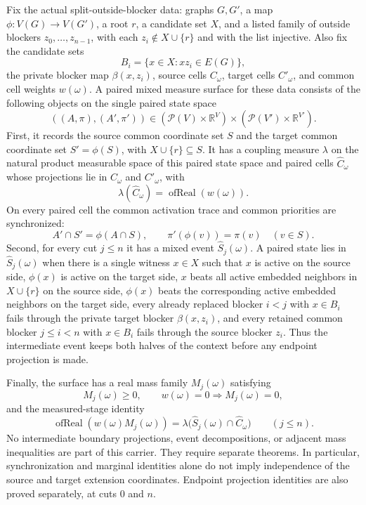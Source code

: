 \begin{definition}
Fix the actual split-outside-blocker data: graphs \(G,G'\), a map
\(\phi:V(G)\to V(G')\), a root \(r\), a candidate set \(X\), and a listed
family of outside blockers \(z_0,\ldots,z_{n-1}\), with each
\(z_i\notin X\cup\{r\}\) and with the list injective.  Also fix the
candidate sets
\[
  B_i=\{x\in X:xz_i\in E(G)\},
\]
the private blocker map \(\beta(x,z_i)\), source cells \(C_\omega\), target
cells \(C'_\omega\), and common cell weights \(w(\omega)\).  A paired mixed
measure surface for these data consists of the following objects on the single
paired state space
\[
  ((A,\pi),(A',\pi'))\in
  (\mathcal P(V)\times \mathbb R^V)\times
  (\mathcal P(V')\times \mathbb R^{V'}).
\]
First, it records the source common coordinate set \(S\) and the target
common coordinate set \(S'=\phi(S)\), with \(X\cup\{r\}\subseteq S\).  It has a
coupling measure \(\lambda\) on the natural product measurable space of this
paired state space and paired cells \(\widehat C_\omega\) whose projections lie in
\(C_\omega\) and \(C'_\omega\), with
\[
  \lambda(\widehat C_\omega)=\operatorname{ofReal}(w(\omega)).
\]
On every paired cell the common activation trace and common priorities are
synchronized:
\[
  A'\cap S'=\phi(A\cap S),\qquad
  \pi'(\phi(v))=\pi(v)\quad(v\in S).
\]
Second, for every cut \(j\le n\) it has a mixed event
\(\widehat S_j(\omega)\).  A paired state lies in
\(\widehat S_j(\omega)\) when there is a single witness \(x\in X\) such that
\(x\) is active on the source side, \(\phi(x)\) is active on the target side,
\(x\) beats all active embedded neighbors in \(X\cup\{r\}\) on the source
side, \(\phi(x)\) beats the corresponding active embedded neighbors on the
target side, every already replaced blocker \(i<j\) with \(x\in B_i\) fails
through the private target blocker \(\beta(x,z_i)\), and every retained
common blocker \(j\le i<n\) with \(x\in B_i\) fails through the source blocker
\(z_i\).  Thus the intermediate event keeps both halves of the context before
any endpoint projection is made.

Finally, the surface has a real mass family \(M_j(\omega)\) satisfying
\[
  M_j(\omega)\ge0,\qquad
  w(\omega)=0\Rightarrow M_j(\omega)=0,
\]
and the measured-stage identity
\[
  \operatorname{ofReal}(w(\omega)M_j(\omega))
  =\lambda\bigl(\widehat S_j(\omega)\cap \widehat C_\omega\bigr)
  \qquad(j\le n).
\]
No intermediate boundary projections, event decompositions, or adjacent
mass inequalities are part of this carrier.  They require separate theorems.
In particular, synchronization and marginal identities alone do not imply
independence of the source and target extension coordinates.  Endpoint
projection identities are also proved separately, at cuts \(0\) and \(n\).
\end{definition}
